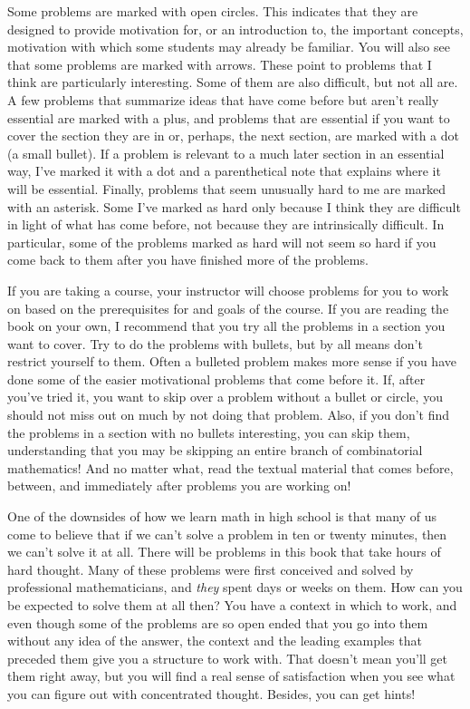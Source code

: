 \documentclass[10pt,]{book}
\theoremstyle{plain}
\theoremstyle{definition}
\theoremstyle{definition}
\numberwithin{equation}{chapter}
\begin{document}
Some problems are marked with open circles. This indicates that they are designed to provide motivation for, or an introduction to, the important concepts, motivation with which some students may already be familiar. You will also see that some problems are marked with arrows. These point to problems that I think are particularly interesting. Some of them are also difficult, but not all are. A few problems that summarize ideas that have come before but aren't really essential are marked with a plus, and problems that are essential if you want to cover the section they are in or, perhaps, the next section, are marked with a dot (a small bullet). If a problem is relevant to a much later section in an essential way, I've marked it with a dot and a parenthetical note that explains where it will be essential. Finally, problems that seem unusually hard to me are marked with an asterisk. Some I've marked as hard only because I think they are difficult in light of what has come before, not because they are intrinsically difficult. In particular, some of the problems marked as hard will not seem so hard if you come back to them after you have finished more of the problems.%
\par
If you are taking a course, your instructor will choose problems for you to work on based on the prerequisites for and goals of the course. If you are reading the book on your own, I recommend that you try all the problems in a section you want to cover. Try to do the problems with bullets, but by all means don't restrict yourself to them. Often a bulleted problem makes more sense if you have done some of the easier motivational problems that come before it. If, after you've tried it, you want to skip over a problem without a bullet or circle, you should not miss out on much by not doing that problem. Also, if you don't find the problems in a section with no bullets interesting, you can skip them, understanding that you may be skipping an entire branch of combinatorial mathematics! And no matter what, read the textual material that comes before, between, and immediately after problems you are working on!%
\par
One of the downsides of how we learn math in high school is that many of us come to believe that if we can't solve a problem in ten or twenty minutes, then we can't solve it at all.  There will be problems in this book that take hours of hard thought.  Many of these problems were first conceived and solved by professional mathematicians, and \emph{they} spent days or weeks on them. How can you be expected to solve them at all then? You have a context in which to work, and even though some of the problems are so open ended that you go into them without any idea of the answer, the context and the leading examples that preceded them give you a structure to work with. That doesn't mean you'll get them right away, but you will find a real sense of satisfaction when you see what you can figure out with concentrated thought. Besides, you can get hints!%
\end{document}
